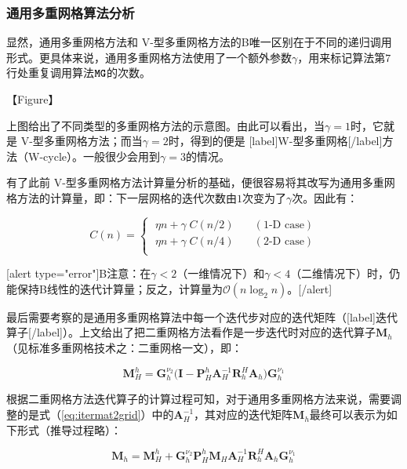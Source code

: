 \documentclass[12pt, UTF8, nofonts]{ctexart}
\begin{document}
\subsubsection*{通用多重网格算法分析}

显然，通用多重网格方法和 V-型多重网格方法的B唯一区别在于不同的递归调用形式。更具体来说，通用多重网格方法使用了一个额外参数$\gamma$，用来标记算法第$7$行处重复调用算法$\textbf{\texttt{MG}}$的次数。

【Figure】

上图给出了不同类型的多重网格方法的示意图。由此可以看出，当$\gamma=1$时，它就是 V-型多重网格方法；而当$\gamma=2$时，得到的便是 [label]W-型多重网格[/label]方法（W-cycle）。一般很少会用到$\gamma=3$的情况。

有了此前 V-型多重网格方法计算量分析的基础，便很容易将其改写为通用多重网格方法的计算量，即：下一层网格的迭代次数由$1$次变为了$\gamma$次。因此有：

\[
  C(n) = \left\{\;
  \begin{aligned}
    \eta n + \gamma\;C(n/2) & \quad (\textrm{1-D case}) \\
    \eta n + \gamma\;C(n/4) & \quad (\textrm{2-D case}) \\
  \end{aligned}\right.
\]

[alert type="error"]B注意：在$\gamma<2$（一维情况下）和$\gamma<4$（二维情况下）时，仍能保持B线性的迭代计算量；反之，计算量为$\mathcal{O}(n\log_2n)$。[/alert]

最后需要考察的是通用多重网格算法中每一个迭代步对应的迭代矩阵（[label]迭代算子[/label]）。上文给出了把二重网格方法看作是一步迭代时对应的迭代算子$\boldsymbol{M}_h$（见标准多重网格技术之：二重网格一文），即：

\begin{equation}
  \label{eq:itermat2grid}
  \boldsymbol{M}_H^h = \boldsymbol{G}_{h}^{\nu_2}\Big( \boldsymbol{I} - \boldsymbol{P}_H^{h}\boldsymbol{A}_{H}^{-1}\boldsymbol{R}_{h}^{H}\boldsymbol{A}_h \Big)\boldsymbol{G}_{h}^{\nu_1}
\end{equation}

根据二重网格方法迭代算子的计算过程可知，对于通用多重网格方法来说，需要调整的是式（\ref{eq:itermat2grid}）中的$\boldsymbol{A}^{-1}_H$，其对应的迭代矩阵$\boldsymbol{M}_h$最终可以表示为如下形式（推导过程略）：

\[
  \boldsymbol{M}_h = \boldsymbol{M}_H^h + \boldsymbol{G}_{h}^{\nu_2} \boldsymbol{P}_H^{h}\boldsymbol{M}_H\boldsymbol{A}_{H}^{-1}\boldsymbol{R}_{h}^{H}\boldsymbol{A}_h\boldsymbol{G}_{h}^{\nu_1}
\]
\end{document}
